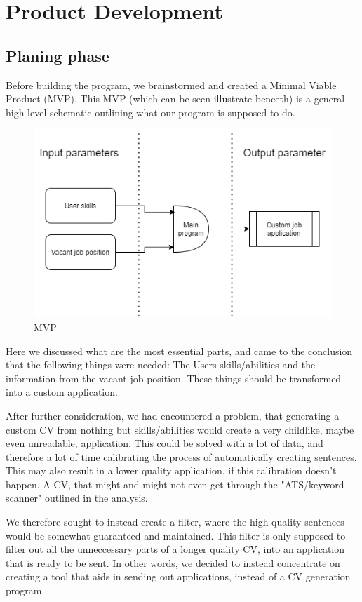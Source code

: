 \section{Product Development}\label{sec:product_development}
\subsection{Planing phase}
Before building the program, we brainstormed and created a Minimal Viable Product (MVP).
This MVP (which can be seen illustrate beneeth) is a general high level schematic outlining what our program is supposed to do.

\begin{figure}[H]
  \centering
  \includegraphics[scale = 0.6]{figures/engMVP}
  \caption{MVP}
\end{figure}
Here we discussed what are the most essential parts, and came to the conclusion that the following things
were needed: The Users skills/abilities and the information from the vacant job position. These things
should be transformed into a custom application. 


After further consideration, we had encountered a problem, that generating a custom CV from nothing but
skills/abilities would create a very childlike, maybe even unreadable, application. This could be solved with a lot
of data, and therefore a lot of time calibrating the process of automatically creating sentences. This may also result
in a lower quality application, if this calibration doesn't happen. 
A CV, that might and might not even get through the "ATS/keyword scanner" outlined in the analysis. 

We therefore sought to instead create a filter, where the high quality sentences would be somewhat guaranteed and maintained.
This filter is only supposed to filter out all the unneccessary parts of a longer quality CV, into an application that
is ready to be sent. In other words, we decided to instead concentrate on creating a tool that aids
in sending out applications, instead of a CV generation program.

